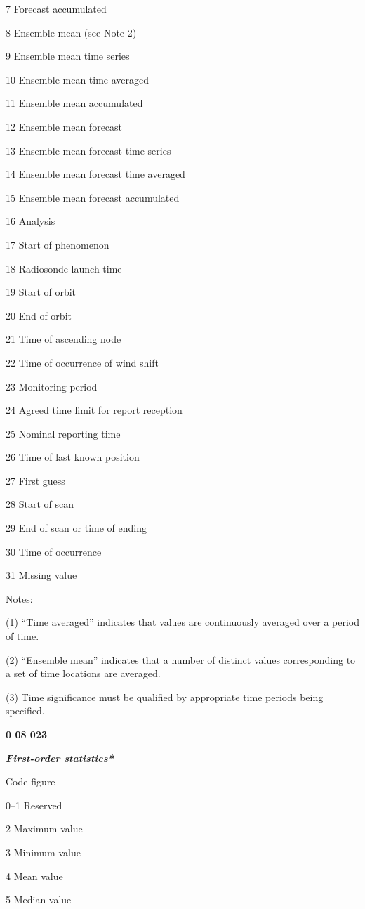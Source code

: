 7 Forecast accumulated

8 Ensemble mean (see Note 2)

9 Ensemble mean time series

10 Ensemble mean time averaged

11 Ensemble mean accumulated

12 Ensemble mean forecast

13 Ensemble mean forecast time series

14 Ensemble mean forecast time averaged

15 Ensemble mean forecast accumulated

16 Analysis

17 Start of phenomenon

18 Radiosonde launch time

19 Start of orbit

20 End of orbit

21 Time of ascending node

22 Time of occurrence of wind shift

23 Monitoring period

24 Agreed time limit for report reception

25 Nominal reporting time

26 Time of last known position

27 First guess

28 Start of scan

29 End of scan or time of ending

30 Time of occurrence

31 Missing value

Notes:

(1) ``Time averaged'' indicates that values are continuously averaged over a period of time.

(2) ``Ensemble mean'' indicates that a number of distinct values corresponding to a set of time locations are averaged.

(3) Time significance must be qualified by appropriate time periods being specified.

\textbf{0 08 023}

\emph{\textbf{First-order statistics*}}

Code figure

0--1 Reserved

2 Maximum value

3 Minimum value

4 Mean value

5 Median value

